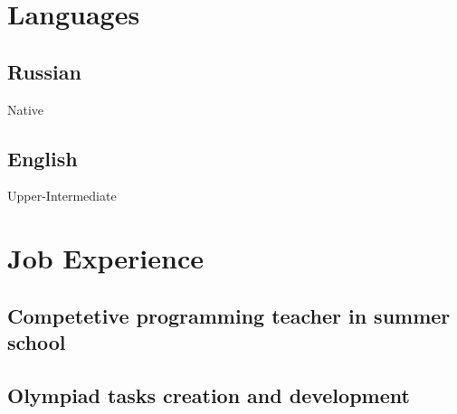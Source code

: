 \documentclass[12pt]{article}
\begin{document}
\section{Languages}

\subsection{Russian} Native

\subsection{English} Upper-Intermediate

\section{Job Experience}

\subsection{Competetive programming teacher in summer school}

\subsection{Olympiad tasks creation and development}
\end{document}
